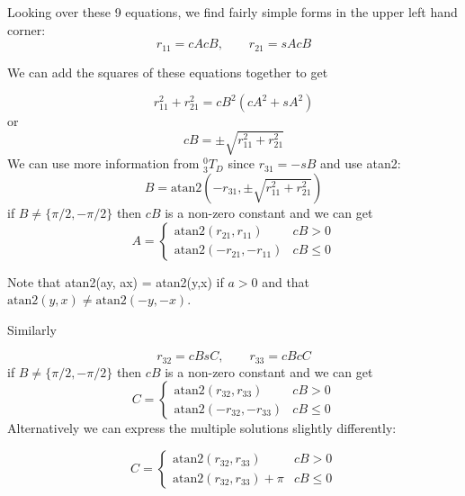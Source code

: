\begin{ExampleCont}
Looking over these 9 equations, we find fairly simple forms in the upper left hand corner:
\[
r_{11} = cAcB, \qquad r_{21} = sAcB
\]

We can add the squares of these equations together to get

\[
r_{11}^2 + r_{21}^2 = cB^2(cA^2 + sA^2)
\]
or
\[
cB = \pm\sqrt{r_{11}^2 + r_{21}^2}
\]
We can use more information from $^0_3T_D$ since $r_{31} = -sB$ and use atan2:
\[
B = \mathrm{atan2}(-r_{31},  \pm\sqrt{r_{11}^2 + r_{21}^2})
\]
if $B \ne \{ \pi/2, -\pi/2 \}$ then $cB$ is a non-zero constant and we can get
\[
A = \left \{ \begin{array}{cl}
                   \mathrm{atan2}( r_{21}, r_{11})      &   cB > 0         \\
                   \mathrm{atan2}(-r_{21},-r_{11})      &   cB \le 0
             \end{array}
    \right .
\]

Note that atan2(ay, ax) = atan2(y,x) if $a>0$ and that $\mathrm{atan2}(y,x) \ne \mathrm{atan2}(-y,-x)$.

Similarly


\[
r_{32} = cBsC, \qquad r_{33} = cBcC
\]
if $B \ne \{ \pi/2, -\pi/2 \}$ then $cB$ is a non-zero constant and we can get
\[
C = \left \{ \begin{array}{cl}
                   \mathrm{atan2}( r_{32}, r_{33})      &   cB > 0         \\
                   \mathrm{atan2}(-r_{32},-r_{33})      &   cB \le 0
             \end{array}
    \right .
\]
Alternatively we can express the multiple solutions slightly differently:

\[
C = \left \{ \begin{array}{cl}
                   \mathrm{atan2}( r_{32}, r_{33})      &   cB > 0         \\
                   \mathrm{atan2}(r_{32},r_{33}) + \pi      &   cB \le 0
             \end{array}
    \right .
\]

\end{ExampleCont}

